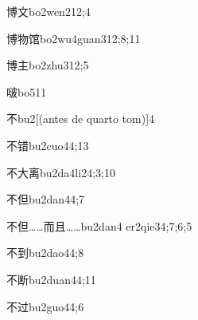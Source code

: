 \begin{verbete}{博文}{bo2wen2}{12;4}
\end{verbete}

\begin{verbete}{博物馆}{bo2wu4guan3}{12;8;11}
\end{verbete}

\begin{verbete}{博主}{bo2zhu3}{12;5}
\end{verbete}

\begin{verbete}{啵}{bo5}{11}
\end{verbete}

\begin{verbete}{不}{bu2}[(antes de quarto tom)]{4}
\end{verbete}

\begin{verbete}{不错}{bu2cuo4}{4;13}
\end{verbete}

\begin{verbete}{不大离}{bu2da4li2}{4;3;10}
\end{verbete}

\begin{verbete}{不但}{bu2dan4}{4;7}
\end{verbete}

\begin{verbete}{不但……而且……}{bu2dan4 er2qie3}{4;7;6;5}
\end{verbete}

\begin{verbete}{不到}{bu2dao4}{4;8}
\end{verbete}

\begin{verbete}{不断}{bu2duan4}{4;11}
\end{verbete}

\begin{verbete}{不过}{bu2guo4}{4;6}
\end{verbete}

